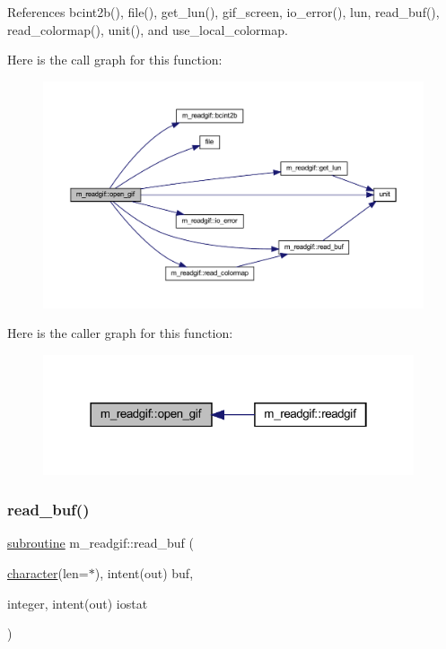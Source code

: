 References bcint2b(), file(), get\+\_\+lun(), gif\+\_\+screen, io\+\_\+error(), lun, read\+\_\+buf(), read\+\_\+colormap(), unit(), and use\+\_\+local\+\_\+colormap.

Here is the call graph for this function\+:
\nopagebreak
\begin{figure}[H]
\begin{center}
\leavevmode
\includegraphics[width=350pt]{namespacem__readgif_ae008e851af60f4d8fdeeb4fd96b8580d_cgraph}
\end{center}
\end{figure}
Here is the caller graph for this function\+:
\nopagebreak
\begin{figure}[H]
\begin{center}
\leavevmode
\includegraphics[width=310pt]{namespacem__readgif_ae008e851af60f4d8fdeeb4fd96b8580d_icgraph}
\end{center}
\end{figure}
\mbox{\label{namespacem__readgif_a272a4dbcc1419d3d103db4c50b757805}} 
\subsubsection{\texorpdfstring{read\+\_\+buf()}{read\_buf()}}
{\footnotesize\ttfamily \hyperlink{M__stopwatch_83_8txt_acfbcff50169d691ff02d4a123ed70482}{subroutine} m\+\_\+readgif\+::read\+\_\+buf (\begin{DoxyParamCaption}\item[{\hyperlink{option__stopwatch_83_8txt_abd4b21fbbd175834027b5224bfe97e66}{character}(len=$\ast$), intent(out)}]{buf,  }\item[{integer, intent(out)}]{iostat }\end{DoxyParamCaption})\hspace{0.3cm}{\ttfamily [private]}}



